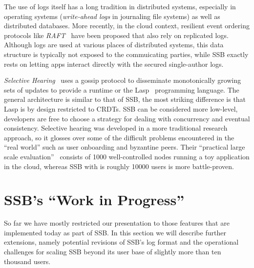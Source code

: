 \documentclass[10pt,sigconf,rewiew]{acmart}
\begin{document}
The use of logs itself has a long tradition in distributed systems,
especially in operating systems ({\em write-ahead logs} in journaling file
systems) as well as distributed databases. More recently, in the cloud
context, resilient event ordering protocols like
{\em RAFT}~\cite{DBLP:conf/usenix/OngaroO14} have been proposed that also
rely on replicated logs. Although logs are used at various places of
distributed systems, this data structure is typically not exposed to
the commuicating parties, while SSB exactly rests on letting apps
interact directly with the secured single-author logs.

\textit{Selective Hearing}~\cite{meiklejohn2015selective} uses a gossip protocol to disseminate monotonically growing sets of updates to provide a runtime or the Lasp~\cite{meiklejohn2015lasp} programming language. The general architecture is similar to that of SSB, the most striking difference is that Lasp is by design restricted to CRDTs. SSB can be considered more low-level, developers are free to choose a strategy for dealing with concurrency and eventual consistency. Selective hearing was developed in a more traditional research approach, so it glosses over some of the difficult problems encountered in the ``real world'' such as user onboarding and byzantine peers. Their ``practical large scale evaluation''~\cite{meiklejohn2017lasp} consists of 1000 well-controlled nodes running a toy application in the cloud, whereas SSB with is roughly 10000 users is more battle-proven.



\section{SSB's ``Work in Progress''}
\label{sec:wip}

So far we have mostly restricted our presentation to those features that are implemented today as part of SSB. In this section we will describe further extensions, namely potential revisions of SSB's log format and the operational challenges for scaling SSB beyond its user base of slightly more than ten thousand users.

\end{document}
